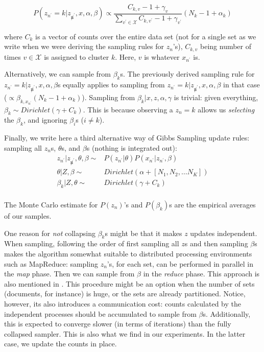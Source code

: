 \documentclass{article}%
\begin{document}
\begin{equation*}
P(z_{n^\prime} = k|z_{\not n^\prime}, x, \alpha, \beta) \propto \frac{C_{k,v}  -1 + \gamma_{v}}{\sum_{ v^{\prime} \in \mathcal{X}}C_{k,v^{\prime}} - 1 + \gamma_{v^{\prime}}} (N_k - 1 + \alpha_k)
\end{equation*}

where $C_k$ is a vector of counts over the entire data set (not for a single set as we write when we were deriving the sampling rules for $z_n$'s), $C_{k,v}$ being number of times $v\in \mathcal{X}$ is assigned to cluster $k$. Here, $v$ is whatever $x_{n^\prime}$ is. 

Alternatively, we can sample from $\beta_k$s. The previously derived sampling rule for $z_{n^\prime} = k|z_{\not n^\prime}, x, \alpha, \beta$s equally applies to sampling from  $z_{n^\prime} = k|z_{\not n^\prime}, x, \alpha, \beta$ in that case ($ \propto \beta_{k, x_{n^\prime}} (N_k - 1 + \alpha_k)$). Sampling from $\beta_k|x,z,\alpha,\gamma$ is trivial: given everything, $\beta_k \sim Dirichlet(\gamma + C_k)$. This is because observing a $z_n = k$ allows us \textit{selecting} the $\beta_k$, and ignoring $\beta_{i}$s ($i\neq k$). 

Finally, we write here a third alternative way of Gibbs Sampling update rules: sampling all $z_n$s, $\theta$s, and $\beta$s (nothing is integrated out):
\begin{align*}
z_{n^\prime}|z_{\not n^\prime},\theta,\beta \sim& P(z_{n^\prime}|\theta) P(x_{n^\prime}|z_{n^\prime}, \beta) \\
\theta|Z, \beta \sim& Dirichlet(\alpha + [N_1, N_2, \dots N_K])\\
\beta_k|Z, \theta \sim& Dirichlet(\gamma + C_k)\\
\end{align*}

The Monte Carlo estimate for $P(z_n)$'s and $P(\beta_k)$s are the empirical averages of our samples.

One reason for \textit{not} collapsing $\beta_k$s might be that it makes $z$ updates independent. When sampling, following the order of first sampling all $z$s and then sampling $\beta$s makes the algorithm somewhat suitable to distributed processing environments such as  MapReduce\cite{dean2008mapreduce}: sampling $z_n$'s, for each set, can be performed in parallel in the \textit{map} phase. Then we can sample from $\beta$ in the \textit{reduce} phase. This approach is also mentioned in \cite{newman2009distributed}. This procedure might be an option when the number of sets (documents, for instance) is huge, or the sets are already partitioned. Notice, however, its also introduces a communication cost: counts calculated by the independent processes should be accumulated to sample from $\beta$s. Additionally, this is expected to converge slower (in terms of iterations) than the fully collapsed sampler. This is also what we find in our experiments. In the latter case, we update the counts in place. 
\end{document}
